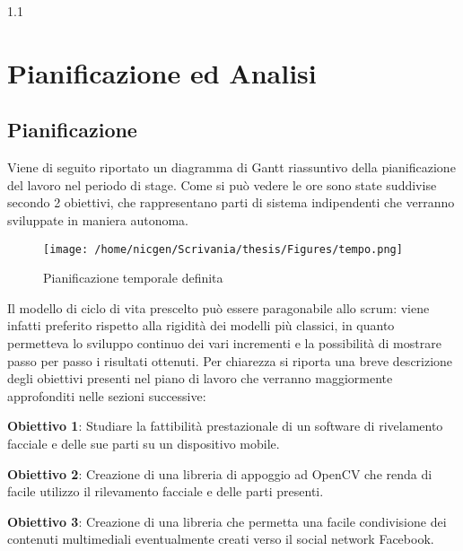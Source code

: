 
1.1\chapter{Pianificazione ed Analisi} %

\label{Capitolo 3} %



\section{Pianificazione}

Viene di seguito riportato un diagramma di Gantt riassuntivo della pianificazione
del lavoro nel periodo di stage. Come si può vedere le ore sono state suddivise secondo
2 obiettivi, che rappresentano parti di sistema indipendenti che verranno sviluppate
in maniera autonoma.\\

\begin{figure}[h]\centering  
\texttt{[image: /home/nicgen/Scrivania/thesis/Figures/tempo.png]}
\caption[Pianificazione temporale]{Pianificazione temporale definita}
\label{pic-a}
\end{figure}

Il modello di ciclo di vita prescelto può essere paragonabile allo scrum: viene infatti preferito rispetto alla rigidità dei modelli più classici, in
quanto permetteva lo sviluppo continuo dei vari incrementi e la possibilità di mostrare
passo per passo i risultati ottenuti. Per chiarezza si riporta una breve descrizione degli
obiettivi presenti nel piano di lavoro che verranno maggiormente approfonditi nelle
sezioni successive:

\textbf{Obiettivo 1}: Studiare la fattibilità prestazionale di un software di rivelamento facciale e delle sue parti su un dispositivo mobile.

\textbf{Obiettivo 2}: Creazione di una libreria di appoggio ad OpenCV che renda di facile utilizzo il rilevamento facciale e delle parti presenti.

\textbf{Obiettivo 3}: Creazione di una libreria che permetta una facile condivisione dei contenuti multimediali eventualmente creati verso il social network Facebook.


